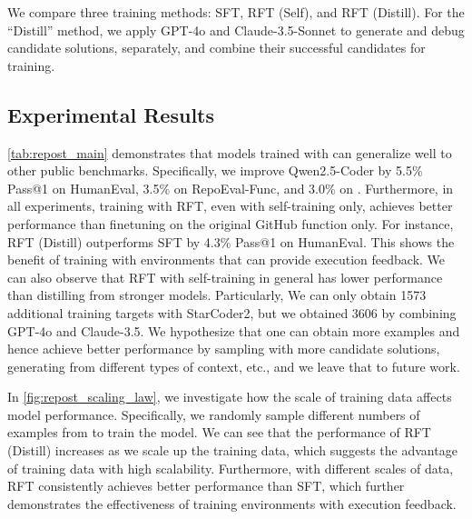 We compare three training methods: SFT, RFT (Self), and RFT (Distill).
For the ``Distill'' method, we apply GPT-4o and Claude-3.5-Sonnet to generate and debug candidate solutions, separately, and combine their successful candidates for training.


\subsection{Experimental Results}
\autoref{tab:repost_main} demonstrates that models trained with \reposttrainsetName can generalize well to other public benchmarks.
Specifically, we improve Qwen2.5-Coder by 5.5\% Pass@1 on HumanEval, 3.5\% on RepoEval-Func, and 3.0\% on \repostevalsetName.
Furthermore, in all experiments, training with RFT, even with self-training only, achieves better performance than finetuning on the original GitHub function only.
For instance, RFT (Distill) outperforms SFT by 4.3\% Pass@1 on HumanEval.
This shows the benefit of training with environments that can provide execution feedback.
We can also observe that RFT with self-training in general has lower performance than distilling from stronger models. 
Particularly,
We can only obtain 1573 additional training targets with StarCoder2, but we obtained 3606 by combining GPT-4o and Claude-3.5.
We hypothesize that one can obtain more examples and hence achieve better performance by sampling with more candidate solutions, generating from different types of context, etc., and we leave that to future work.




In \autoref{fig:repost_scaling_law}, we investigate how the scale of training data affects model performance. 
Specifically, we randomly sample different numbers of examples from \reposttrainsetName to train the model.
We can see that the performance of RFT (Distill) increases as we scale up the training data, which suggests the advantage of training data with high scalability.
Furthermore, with different scales of data, RFT consistently achieves better performance than SFT, which further demonstrates the effectiveness of training environments with execution feedback.



